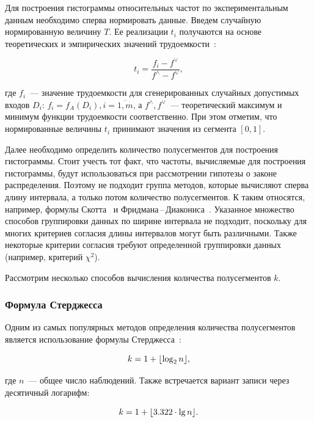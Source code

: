 \documentclass[a4paper, article, 14pt]{extarticle}
\begin{document}
Для построения гистограммы относительных частот по экспериментальным данным необходимо сперва нормировать данные. Введем случайную нормированную величину $T$. Ее реализации $t_i$ получаются на основе теоретических и эмпирических значений трудоемкости~\cite{petrushyn_ulyanov_analysis}:

\begin{equation}\label{eq:t_value}
	t_i = \frac{f_i - f^\vee}{f^\wedge - f^\vee},
\end{equation}

\noindent где $f_i$~--- значение трудоемкости для сгенерированных случайных допустимых входов $D_i$: $f_i = f_A(D_i), i = \overline{1, m}$, а $f^\wedge, f^\vee$~--- теоретический максимум и минимум функции трудоемкости соответственно. При этом отметим, что нормированные величины $t_i$ принимают значения из сегмента $[0, 1]$.

Далее необходимо определить количество полусегментов для построения гистограммы. Стоит учесть тот факт, что частоты, вычисляемые для построения гистограммы, будут использоваться при рассмотрении гипотезы о законе распределения. Поэтому не подходит группа методов, которые вычисляют сперва длину интервала, а только потом количество полусегментов. К таким относятся, например, формулы Скотта~\cite{scott} и Фридмана\,--\,Диакониса~\cite{freedman_diaconis}. Указанное множество способов группировки данных по ширине интервала не подходит, поскольку для многих критериев согласия длины интервалов могут быть различными. Также некоторые критерии согласия требуют определенной группировки данных (например, критерий $\chi^2$).

Рассмотрим несколько способов вычисления количества полусегментов $k$.

\subsubsection{Формула Стерджесса}\label{sec:frequency_histogram_size_sturges}

Одним из самых популярных методов определения количества полусегментов является использование формулы Стерджесса~\cite{sturges}:

\begin{equation}\label{eq:sturges_log2}
	k = 1 + \floor*{\log_2{n}},
\end{equation}

\noindent где $n$~--- общее число наблюдений. Также встречается вариант записи через десятичный логарифм:

\begin{equation}\label{eq:sturges_lg}
	k = 1 + \floor*{3.322 \cdot \lg{n}}.
\end{equation}
\end{document}
